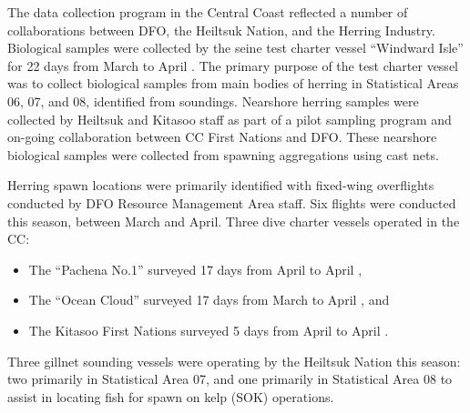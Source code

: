 The data collection program in the Central Coast reflected a number of collaborations between DFO, the Heiltsuk Nation, and the Herring Industry.
Biological samples were collected by the seine test charter vessel ``Windward Isle'' for 22 days from March 
to April .
The primary purpose of the test charter vessel was to collect biological samples from main bodies of herring in Statistical Areas 06, 07, and 08, identified from soundings.
Nearshore herring samples were collected by Heiltsuk and Kitasoo staff as part of a pilot sampling program and on-going collaboration between CC First Nations and DFO.
These nearshore biological samples were collected from spawning aggregations using cast nets.

Herring spawn locations were primarily identified with fixed-wing overflights conducted by DFO Resource Management Area staff.
Six flights were conducted this season, between March and April.
Three dive charter vessels operated in the CC:
\begin{itemize}
\item The ``Pachena No.1'' surveyed 17 days from April  to April ,
\item The ``Ocean Cloud'' surveyed 17 days from March  to April , and
\item The Kitasoo First Nations surveyed 5 days from April  to April .
\end{itemize}
Three gillnet sounding vessels were operating by the Heiltsuk Nation this season:
two primarily in Statistical Area 07, and one primarily in Statistical Area 08 to assist in locating fish for spawn on kelp (SOK) operations.